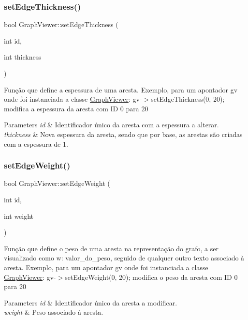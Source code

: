 \subsubsection{\texorpdfstring{set\+Edge\+Thickness()}{setEdgeThickness()}}
{\footnotesize\ttfamily bool Graph\+Viewer\+::set\+Edge\+Thickness (\begin{DoxyParamCaption}\item[{int}]{id,  }\item[{int}]{thickness }\end{DoxyParamCaption})}

Função que define a espessura de uma aresta. Exemplo, para um apontador gv onde foi instanciada a classe \hyperlink{class_graph_viewer}{Graph\+Viewer}\+: gv-\/$>$set\+Edge\+Thickness(0, 20); modifica a espessura da aresta com ID 0 para 20


\begin{DoxyParams}{Parameters}
{\em id} & Identificador único da aresta com a espessura a alterar. \\
\hline
{\em thickness} & Nova espessura da aresta, sendo que por base, as arestas são criadas com a espessura de 1. \\
\hline
\end{DoxyParams}
\hypertarget{class_graph_viewer_ac211de009a0afe2e6d44f4f8d030a2cc}{}\label{class_graph_viewer_ac211de009a0afe2e6d44f4f8d030a2cc} 
\subsubsection{\texorpdfstring{set\+Edge\+Weight()}{setEdgeWeight()}}
{\footnotesize\ttfamily bool Graph\+Viewer\+::set\+Edge\+Weight (\begin{DoxyParamCaption}\item[{int}]{id,  }\item[{int}]{weight }\end{DoxyParamCaption})}

Função que define o peso de uma aresta na representação do grafo, a ser visualizado como w\+: valor\+\_\+do\+\_\+peso, seguido de qualquer outro texto associado à aresta. Exemplo, para um apontador gv onde foi instanciada a classe \hyperlink{class_graph_viewer}{Graph\+Viewer}\+: gv-\/$>$set\+Edge\+Weight(0, 20); modifica o peso da aresta com ID 0 para 20


\begin{DoxyParams}{Parameters}
{\em id} & Identificador único da aresta a modificar. \\
\hline
{\em weight} & Peso associado à aresta. \\
\hline
\end{DoxyParams}
\hypertarget{class_graph_viewer_a8b542d7e09e81a45a74760c19233beb0}{}\label{class_graph_viewer_a8b542d7e09e81a45a74760c19233beb0} 
